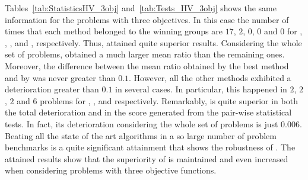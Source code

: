 Tables~\ref{tab:StatisticsHV_3obj} and~\ref{tab:Tests_HV_3obj} shows the same information for the problems with three objectives.
%
In this case the number of times that each method belonged to the winning groups are $17$, $2$, $0$, $0$ and $0$ 
for \AVSDMOEAD{}, \RMOEA{}, \MOEADDE{}, \NSGAIII{} and \NSGAII{}, respectively.
%
Thus, \AVSDMOEAD{} attained quite superior results.
%
Considering the whole set of problems, \AVSDMOEAD{} obtained a much larger mean \HV{} ratio than the remaining ones.
%
Moreover, the difference between the mean \HV{} ratio obtained by the best method and by \AVSDMOEAD{} was never greater than $0.1$.
%
However, all the other methods exhibited a deterioration greater than $0.1$ in several cases.
%
In particular, this happened in $2$, $2$, $2$ and $6$ problems for \MOEADDE{}, \RMOEA{}, \NSGAIII{} and \NSGAII{} respectively.
%
Remarkably, \AVSDMOEAD{} is quite superior in both the total deterioration and in the score generated from the pair-wise
statistical tests.
%
In fact, its deterioration considering the whole set of problems is just $0.006$.
%
Beating all the state of the art algorithms in a so large number of problem benchmarks is a quite significant attainment that shows
the robustness of \AVSDMOEAD{}.
%
%
The attained results show that the superiority of \AVSDMOEAD{} is maintained and even increased when considering 
problems with three objective functions.
%
%
%
%



